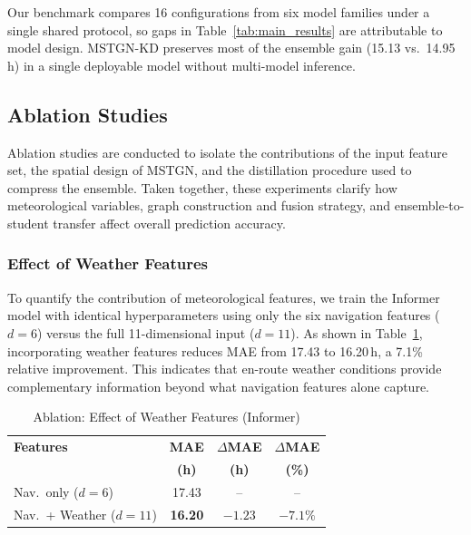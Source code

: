 \documentclass[sigconf,anonymous]{acmart}%
\begin{document}
Our benchmark compares 16 configurations from six model families under a single shared protocol, so gaps in Table~\ref{tab:main_results} are attributable to model design. MSTGN-KD preserves most of the ensemble gain (15.13 vs.\ 14.95\,h) in a single deployable model without multi-model inference.




\subsection{Ablation Studies}
\label{sec:ablations}

Ablation studies are conducted to isolate the contributions of the input feature set, the spatial design of MSTGN, and the distillation procedure used to compress the ensemble. Taken together, these experiments clarify how meteorological variables, graph construction and fusion strategy, and ensemble-to-student transfer affect overall prediction accuracy.

\subsubsection{Effect of Weather Features}

To quantify the contribution of meteorological features, we train the Informer model with identical hyperparameters using only the six navigation features ($d = 6$) versus the full 11-dimensional input ($d = 11$). As shown in Table~\ref{tab:ablation_weather}, incorporating weather features reduces MAE from 17.43 to 16.20\,h, a 7.1\% relative improvement. This indicates that en-route weather conditions provide complementary information beyond what navigation features alone capture.

\begin{table}[t]
    \centering
    \caption{Ablation: Effect of Weather Features (Informer)}
    \label{tab:ablation_weather}
    \begin{tabular}{lccc}
        \toprule
        \textbf{Features} & \textbf{MAE} & $\Delta$\textbf{MAE} & $\Delta$\textbf{MAE} \\
        & \textbf{(h)} & \textbf{(h)} & \textbf{(\%)} \\
        \midrule
        Nav.\ only ($d=6$) & 17.43 & -- & -- \\
        Nav.\ + Weather ($d=11$) & \textbf{16.20} & $-1.23$ & $-7.1\%$ \\
        \bottomrule
    \end{tabular}
\end{table}
\end{document}
